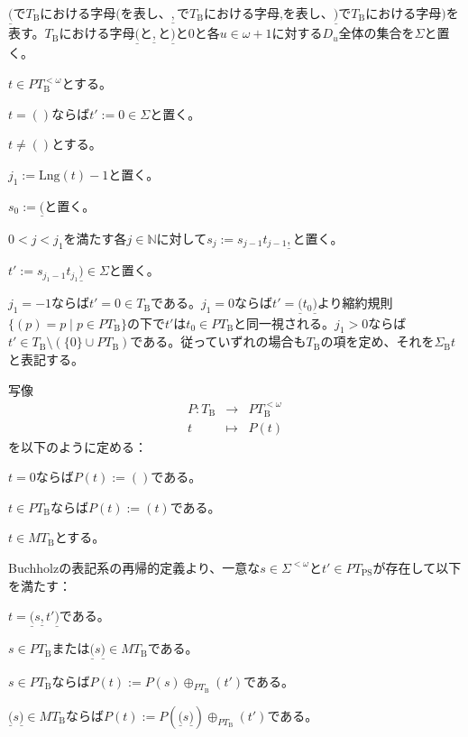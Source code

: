\documentclass[dvipdfmx,uplatex]{jsarticle}
\theoremstyle{customnonumberbreakfortheorem}
\theoremstyle{customnonumberbreakforproof}
\begin{document}
\(\underline{(}\)で\(T_{\textrm{B}}\)における字母\(\textrm{(}\)を表し、\(\underline{,}\)で\(T_{\textrm{B}}\)における字母\(\textrm{,}\)を表し、\(\underline{)}\)で\(T_{\textrm{B}}\)における字母\(\textrm{)}\)を表す。\(T_{\textrm{B}}\)における字母\(\underline{(}\)と\(\underline{,}\)と\(\underline{)}\)と\(0\)と各\(u \in \omega+1\)に対する\(D_u\)全体の集合を\(\Sigma\)と置く。

\(t \in PT_{\textrm{B}}^{< \omega}\)とする。
\begin{nenumerate}
	\item \(t = ()\)ならば\(t' := 0 \in \Sigma\)と置く。
	\item \(t \neq ()\)とする。
	\begin{nenumerate}
		\item \(j_1 := \textrm{Lng}(t)-1\)と置く。
		\item \(s_0 := \underline{(}\)と置く。
		\item \(0 < j < j_1\)を満たす各\(j \in \mathbb{N}\)に対して\(s_j := s_{j-1} t_{j-1} \underline{,}\)と置く。
		\item \(t' := s_{j_1-1} t_{j_1} \underline{)} \in \Sigma\)と置く。
	\end{nenumerate}
\end{nenumerate}
\(j_1 = -1\)ならば\(t' = 0 \in T_{\textrm{B}}\)である。\(j_1 = 0\)ならば\(t' = \underline{(} t_0 \underline{)}\)より縮約規則\(\{(p) = p \mid p \in PT_{\textrm{B}}\}\)の下で\(t'\)は\(t_0 \in PT_{\textrm{B}}\)と同一視される。\(j_1 > 0\)ならば\(t' \in T_{\textrm{B}} \setminus (\{0\} \cup PT_{\textrm{B}})\)である。従っていずれの場合も\(T_{\textrm{B}}\)の項を定め、それを\(\Sigma_{\textrm{B}} t\)と表記する。

写像
\begin{eqnarray*}
P \colon T_{\textrm{B}} & \to & PT_{\textrm{B}}^{< \omega} \\
t & \mapsto & P(t)
\end{eqnarray*}
を以下のように定める：
\begin{nenumerate}
	\item \(t = 0\)ならば\(P(t) := ()\)である。
	\item \(t \in PT_{\textrm{B}}\)ならば\(P(t) := (t)\)である。
	\item \(t \in MT_{\textrm{B}}\)とする。
	\begin{nenumerate}
		\item Buchholzの表記系の再帰的定義より、一意な\(s \in \Sigma^{<\omega}\)と\(t' \in PT_{\textrm{PS}}\)が存在して以下を満たす：
		\begin{nenumerate}
			\item \(t = \underline{(} s \underline{,} t' \underline{)}\)である。
			\item \(s \in PT_{\textrm{B}}\)または\(\underline{(} s \underline{)} \in MT_{\textrm{B}}\)である。
		\end{nenumerate}
		\item \(s \in PT_{\textrm{B}}\)ならば\(P(t) := P(s) \oplus_{PT_{\textrm{B}}} (t')\)である。
		\item \(\underline{(} s \underline{)} \in MT_{\textrm{B}}\)ならば\(P(t) := P(\underline{(} s \underline{)}) \oplus_{PT_{\textrm{B}}} (t')\)である。
	\end{nenumerate}
\end{nenumerate}
\end{document}
